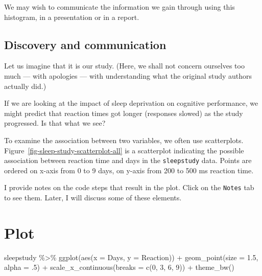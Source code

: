 \documentclass[
  letterpaper,
  DIV=11,
  numbers=noendperiod]{scrreprt}
\newenvironment{Shaded}{\begin{snugshade}}{\end{snugshade}}
\newcommand{\AttributeTok}[1]{\textcolor[rgb]{0.40,0.45,0.13}{#1}}
\newcommand{\DecValTok}[1]{\textcolor[rgb]{0.68,0.00,0.00}{#1}}
\newcommand{\FloatTok}[1]{\textcolor[rgb]{0.68,0.00,0.00}{#1}}
\newcommand{\FunctionTok}[1]{\textcolor[rgb]{0.28,0.35,0.67}{#1}}
\newcommand{\NormalTok}[1]{\textcolor[rgb]{0.00,0.23,0.31}{#1}}
\newcommand{\SpecialCharTok}[1]{\textcolor[rgb]{0.37,0.37,0.37}{#1}}
\begin{document}
We may wish to communicate the information we gain through using this
histogram, in a presentation or in a report.

\hypertarget{sec-sleepstudy-scatter}{%
\subsection{Discovery and communication}\label{sec-sleepstudy-scatter}}

Let us imagine that it is our study. (Here, we shall not concern
ourselves too much --- with apologies --- with understanding what the
original study authors actually did.)

If we are looking at the impact of sleep deprivation on cognitive
performance, we might predict that reaction times got longer (responses
slowed) as the study progressed. Is that what we see?

To examine the association between two variables, we often use
scatterplots. Figure~\ref{fig-sleep-study-scatterplot-all} is a
scatterplot indicating the possible association between reaction time
and days in the \texttt{sleepstudy} data. Points are ordered on x-axis
from 0 to 9 days, on y-axis from 200 to 500 ms reaction time.

I provide notes on the code steps that result in the plot. Click on the
\texttt{Notes} tab to see them. Later, I will discuss some of these
elements.

\section{Plot}

\begin{Shaded}
\begin{Highlighting}[]
\NormalTok{sleepstudy }\SpecialCharTok{\%\textgreater{}\%}
  \FunctionTok{ggplot}\NormalTok{(}\FunctionTok{aes}\NormalTok{(}\AttributeTok{x =}\NormalTok{ Days, }\AttributeTok{y =}\NormalTok{ Reaction)) }\SpecialCharTok{+}
  \FunctionTok{geom\_point}\NormalTok{(}\AttributeTok{size =} \FloatTok{1.5}\NormalTok{, }\AttributeTok{alpha =}\NormalTok{ .}\DecValTok{5}\NormalTok{) }\SpecialCharTok{+} 
  \FunctionTok{scale\_x\_continuous}\NormalTok{(}\AttributeTok{breaks =} \FunctionTok{c}\NormalTok{(}\DecValTok{0}\NormalTok{, }\DecValTok{3}\NormalTok{, }\DecValTok{6}\NormalTok{, }\DecValTok{9}\NormalTok{)) }\SpecialCharTok{+}
  \FunctionTok{theme\_bw}\NormalTok{()}
\end{Highlighting}
\end{Shaded}
\end{document}
